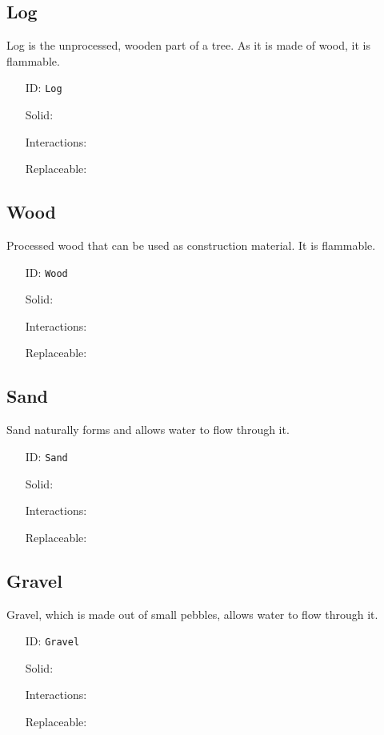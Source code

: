 \subsection{Log}\label{subsec:blocks_log}
Log is the unprocessed, wooden part of a tree. As it is made of wood, it is flammable.
\newline
\begin{itemize}[nosep]
    \item[ID:] \texttt{Log}
    \item[Solid:]  \Checkmark \item[Interactions:]  \XSolidBrush \item[Replaceable:]  \XSolidBrush
\end{itemize}

\subsection{Wood}\label{subsec:blocks_wood}
Processed wood that can be used as construction material. It is flammable.
\newline
\begin{itemize}[nosep]
    \item[ID:] \texttt{Wood}
    \item[Solid:]  \Checkmark \item[Interactions:]  \XSolidBrush \item[Replaceable:]  \XSolidBrush
\end{itemize}

\subsection{Sand}\label{subsec:blocks_sand}
Sand naturally forms and allows water to flow through it.
\newline
\begin{itemize}[nosep]
    \item[ID:] \texttt{Sand}
    \item[Solid:]  \Checkmark \item[Interactions:]  \XSolidBrush \item[Replaceable:]  \XSolidBrush
\end{itemize}

\subsection{Gravel}\label{subsec:blocks_gravel}
Gravel, which is made out of small pebbles, allows water to flow through it.
\newline
\begin{itemize}[nosep]
    \item[ID:] \texttt{Gravel}
    \item[Solid:]  \Checkmark \item[Interactions:]  \XSolidBrush \item[Replaceable:]  \XSolidBrush
\end{itemize}

